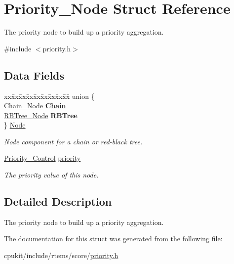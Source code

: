 \hypertarget{structPriority__Node}{}\section{Priority\+\_\+\+Node Struct Reference}
\label{structPriority__Node}


The priority node to build up a priority aggregation.  




{\ttfamily \#include $<$priority.\+h$>$}

\subsection*{Data Fields}
\begin{DoxyCompactItemize}
\item 
\mbox{\label{structPriority__Node_a4cab6a38bbd38b57cfa0facfb82da9f6}} 
\begin{tabbing}
xx\=xx\=xx\=xx\=xx\=xx\=xx\=xx\=xx\=\kill
union \{\\
\>\mbox{\hyperlink{group__RTEMSScoreChain_ga0dd4bfcca1ac7f90de2842e447846d3d}{Chain\_Node}} {\bfseries Chain}\\
\>\mbox{\hyperlink{structRBTree__Node}{RBTree\_Node}} {\bfseries RBTree}\\
\} \mbox{\hyperlink{structPriority__Node_a4cab6a38bbd38b57cfa0facfb82da9f6}{Node}}\\

\end{tabbing}\begin{DoxyCompactList}\small\item\em Node component for a chain or red-\/black tree. \end{DoxyCompactList}\item 
\mbox{\label{structPriority__Node_a7076b9b0a994d7f8e4126463859626b8}} 
\mbox{\hyperlink{group__RTEMSScorePriority_ga59d02b58072d31a9a1cfe644557aefe2}{Priority\+\_\+\+Control}} \mbox{\hyperlink{structPriority__Node_a7076b9b0a994d7f8e4126463859626b8}{priority}}
\begin{DoxyCompactList}\small\item\em The priority value of this node. \end{DoxyCompactList}\end{DoxyCompactItemize}


\subsection{Detailed Description}
The priority node to build up a priority aggregation. 

The documentation for this struct was generated from the following file\+:\begin{DoxyCompactItemize}
\item 
cpukit/include/rtems/score/\mbox{\hyperlink{rtems_2score_2priority_8h}{priority.\+h}}\end{DoxyCompactItemize}
